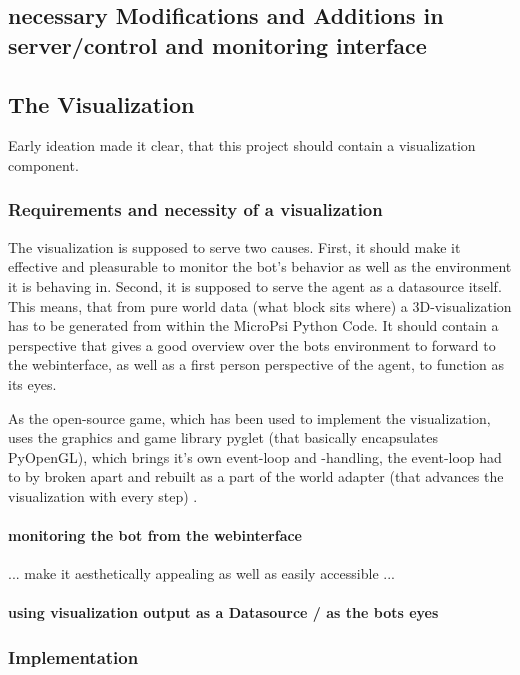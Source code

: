 \subsection{necessary Modifications and Additions in server/control and monitoring interface}

\subsection{The Visualization}
Early ideation made it clear, that this project should contain a visualization component. 

\subsubsection{Requirements and necessity of a visualization}
The visualization is supposed to serve two causes. First, it should make it effective and pleasurable to monitor the bot's behavior as well as the environment it is behaving in. Second, it is supposed to serve the agent as a datasource itself. This means, that from pure world data (what block sits where) a 3D-visualization has to be generated from within the MicroPsi Python Code. It should contain a perspective that gives a good overview over the bots environment to forward to the webinterface, as well as a first person perspective of the agent, to function as its eyes.

As the open-source game, which has been used to implement the visualization, uses the graphics and game library pyglet (that basically encapsulates PyOpenGL), which brings it's own event-loop and -handling, the event-loop had to by broken apart and rebuilt as a part of the world adapter (that advances the visualization with every step) .


\paragraph{monitoring the bot from the webinterface}
... make it aesthetically appealing as well as easily accessible ...

\paragraph{using visualization output as a Datasource / as the bots eyes}

\subsubsection{Implementation}

